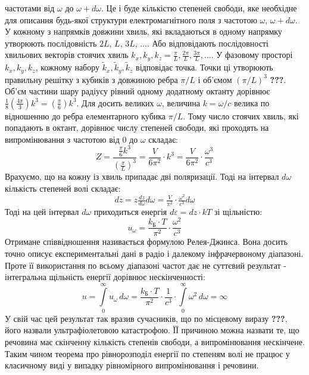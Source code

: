 \documentclass{article}
\begin{document}
частотами від $\omega$ до $\omega + d\omega$. Це і буде кількістю степеней свободи, яке необхідне для описання будь-якої структури електромагнітного поля з частотою $\omega$, $\omega + d\omega$. У кожному з напрямків довжини хвиль, 
які вкладаються в одному напрямку утворюють послідовність $2L$, $L$, $3L$, $\dots$. Або відповідають послідовності хвильових векторів стоячих хвиль $k_{x}, k_{y}, k_{z} = \tfrac{\pi}{L}, \tfrac{2\pi}{L}, \tfrac{3\pi}{L}, \dots$. 
У фазовому просторі $k_{x}, k_{y}, k_{z}$, кожному набору  $\tilde{k}_{x}, \tilde{k}_{y}, \tilde{k}_{z}$ відповідає точка. Точки ці утворюють правильну решітку з кубиків з довжиною ребра $\pi/L$ і  об’ємом $(\pi/L)^{3}$ \textbf{???}. 
Об’єм частини шару радіусу рівний одному додатному октанту дорівнює $\tfrac{1}{8} \left(\frac{4\pi}{3}\right)k^{3} = \left(\frac{\pi}{6}\right)k^{3}$. Для досить великих $\omega$, величина $k = \omega / c$ велика по відношенню до 
ребра елементарного кубика $\pi/L$. Тому число стоячих хвиль, які попадають в октант, дорівнює числу степеней свободи, які проходять на випромінювання з частотою від $0$ до $\omega$ складає: 
\begin{equation}
    \label{eq:AmountDegrees_of_Freedom}
    Z = \frac{\tfrac{\pi}{6} k^{3}}{\left(\tfrac{\pi}{L}\right)^{3}} = \frac{V}{6 \pi^{2}} \cdot k^{3} = \frac{V}{6 \pi^{2}} \cdot \frac{\omega^{3}}{c^{3}}
\end{equation}
Врахуємо, що на кожну із хвиль припадає дві поляризації. Тоді на інтервал $d\omega$ кількість степеней волі складає:
\begin{equation}
    \label{eq:AmountDegrees_of_Freedom_per_Interval}
    dz = z \tfrac{dz}{d\omega} d\omega = \tfrac{V}{\pi^{2}} \cdot \tfrac{\omega^{2}}{c^{3}} d\omega
\end{equation}                                              
Тоді на цей інтервал $d\omega$ приходиться енергія $d\varepsilon = dz \cdot kT$ зі щільністю:
\begin{equation}
    \label{eq:EnergyDensity_on_Interval}
    u_{\omega} = \frac{k_{\text{Б}} \cdot T}{\pi^{2}} \cdot \frac{\omega^{2}}{c^{3}}
\end{equation}
Отримане співвідношення називається формулою Релея-Джинса. Вона досить точно описує експериментальні дані в радіо і далекому інфрачервоному діапазоні. Проте її використання по всьому діапазоні частот дає не суттєвий результат - 
інтегральна щільність енергії дорівнює нескінченності:
\begin{equation}
    \label{eq:IntegralEnergyDensity}
    u = \int\limits_{0}^{\infty} u_{\omega} \, d\omega = \frac{k_{\text{Б}} \cdot T}{\pi^{2}} \cdot \frac{1}{c^{3}} \cdot \int\limits_{0}^{\infty} \omega^{2} \, d\omega = \infty
\end{equation}
У свій час цей результат так вразив сучасників, що по місцевому виразу \textbf{???}, його назвали ультрафіолетовою катастрофою. ЇЇ причиною можна назвати те, що речовина має скінченну кількість степенів свободи, 
а випромінювання нескінчене. Таким чином теорема про рівнорозподіл енергії по степеням волі не працює у класичному виді у випадку рівномірного випромінювання і речовини.
\end{document}
